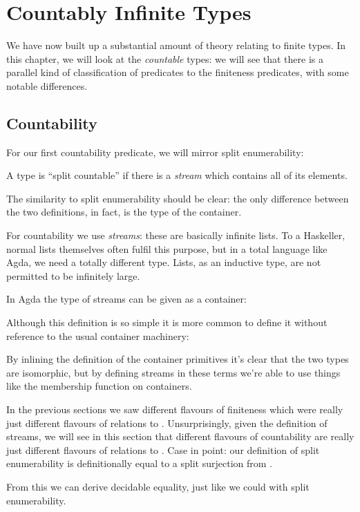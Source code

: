 \chapter{Countably Infinite Types} \label{infinite}
We have now built up a substantial amount of theory relating to finite types.
In this chapter, we will look at the \emph{countable} types: we will see that
there is a parallel kind of classification of predicates to the finiteness
predicates, with some notable differences.
\section{Countability}
For our first countability predicate, we will mirror split enumerability:
\begin{definition}
  A type is ``split countable'' if there is a \emph{stream} which contains all
  of its elements.
  \begin{agdalisting*}
  \end{agdalisting*}
\end{definition}
The similarity to split enumerability should be clear: the only difference
between the two definitions, in fact, is the type of the container.

For countability we use \emph{streams}: these are basically infinite lists.
To a Haskeller, normal lists themselves often fulfil this purpose, but in a
total language like Agda, we need a totally different type.
Lists, as an inductive type, are not permitted to be infinitely large.
\begin{definition}[Streams]
  In Agda the type of streams can be given as a container:
  \begin{agdalisting*}
  \end{agdalisting*}
  Although this definition is so simple it is more common to define it without
  reference to the usual container machinery:
  \begin{agdalisting*}
  \end{agdalisting*}
  By inlining the definition of the container primitives it's clear that the two
  types are isomorphic, but by defining streams in these terms we're able to
  use things like the membership function on containers.
\end{definition}

In the previous sections we saw different flavours of finiteness which were
really just different flavours of relations to .
Unsurprisingly, given the definition of streams, we will see in this section
that different flavours of countability are really just different flavours of
relations to .
Case in point: our definition of split enumerability is definitionally equal to
a split surjection from .
\begin{agdalisting*}
\end{agdalisting*}
From this we can derive decidable equality, just like we could with split
enumerability. 
